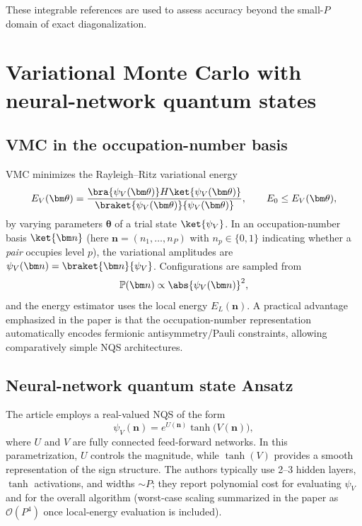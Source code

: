 These integrable references are used to assess accuracy beyond the small-$P$ domain of exact diagonalization. 

\section{Variational Monte Carlo with neural-network quantum states}
\subsection{VMC in the occupation-number basis}
VMC minimizes the Rayleigh--Ritz variational energy
\begin{equation}
E_V(\bm\theta)=\frac{\bra{\psi_V(\bm\theta)}H\ket{\psi_V(\bm\theta)}}{\braket{\psi_V(\bm\theta)}{\psi_V(\bm\theta)}},
\qquad E_0\le E_V(\bm\theta),
\label{eq:Ev}
\end{equation}
by varying parameters $\bm\theta$ of a trial state $\ket{\psi_V}$.
In an occupation-number basis $\ket{\bm n}$ (here $\bm n=(n_1,\dots,n_P)$ with $n_p\in\{0,1\}$ indicating whether
a \emph{pair} occupies level $p$), the variational amplitudes are $\psi_V(\bm n)=\braket{\bm n}{\psi_V}$.
Configurations are sampled from
\begin{equation}
\mathbb{P}(\bm n)\propto \abs{\psi_V(\bm n)}^2,
\label{eq:prob}
\end{equation}
and the energy estimator uses the local energy $E_L(\bm n)$.
A practical advantage emphasized in the paper is that the occupation-number representation automatically encodes
fermionic antisymmetry/Pauli constraints, allowing comparatively simple NQS architectures. 

\subsection{Neural-network quantum state Ansatz}
The article employs a real-valued NQS of the form
\begin{equation}
\psi_V(\bm n)=e^{U(\bm n)}\tanh\!\big(V(\bm n)\big),
\label{eq:nqs}
\end{equation}
where $U$ and $V$ are fully connected feed-forward networks. In this parametrization, $U$ controls the magnitude,
while $\tanh(V)$ provides a smooth representation of the sign structure. The authors typically use 2--3 hidden layers,
$\tanh$ activations, and widths $\sim P$; they report polynomial cost for evaluating $\psi_V$ and for the overall
algorithm (worst-case scaling summarized in the paper as $\mathcal{O}(P^4)$ once local-energy evaluation is included). 


